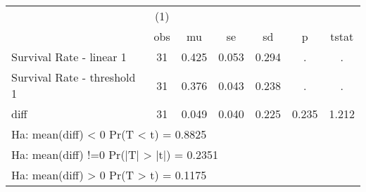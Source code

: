 {
\def\sym#1{\ifmmode^{#1}\else\(^{#1}\)\fi}
\begin{tabular}{l*{1}{cccccc}}
\hline\hline
                    &\multicolumn{1}{c}{(1)}&            &            &            &            &            \\
                    &         obs&          mu&          se&          sd&           p&       tstat\\
\hline
Survival Rate - linear 1&          31&       0.425&       0.053&       0.294&           .&           .\\
Survival Rate - threshold 1&          31&       0.376&       0.043&       0.238&           .&           .\\
diff                &          31&       0.049&       0.040&       0.225&       0.235&       1.212\\
\hline\hline
\multicolumn{7}{l}{\footnotesize Ha: mean(diff) < 0   Pr(T < t) = 0.8825}\\
\multicolumn{7}{l}{\footnotesize Ha: mean(diff) !=0   Pr(|T| > |t|) = 0.2351}\\
\multicolumn{7}{l}{\footnotesize Ha: mean(diff) > 0   Pr(T > t) = 0.1175}\\
\end{tabular}
}
